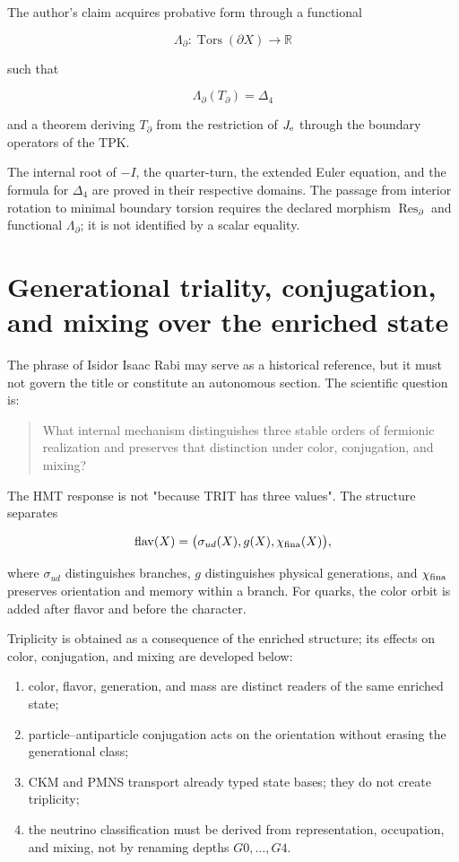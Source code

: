 The author's claim acquires probative form through a functional

\[
\Lambda_\partial:
\operatorname{Tors}(\partial X)
\longrightarrow\mathbb R
\]

such that

\[
\Lambda_\partial(T_\partial)=\Delta_4
\]

and a theorem deriving \(T_\partial\) from the restriction of \(J_{\rm e}\) through the boundary operators of the TPK.

The internal root of \(-I\), the quarter-turn, the extended Euler equation, and the formula for \(\Delta_4\) are proved in their respective domains. The passage from interior rotation to minimal boundary torsion requires the declared morphism \(\operatorname{Res}_{\partial}\) and functional \(\Lambda_{\partial}\); it is not identified by a scalar equality.


\section{Generational triality, conjugation, and mixing over the enriched state}

The phrase of Isidor Isaac Rabi may serve as a historical reference, but it must not govern the title or constitute an autonomous section. The scientific question is:

\begin{quote}
What internal mechanism distinguishes three stable orders of fermionic realization and preserves that distinction under color, conjugation, and mixing?
\end{quote}

The HMT response is not "because TRIT has three values". The structure separates

\[
\operatorname{flav}(X)
=\bigl(\sigma_{ud}(X),g(X),\chi_{\rm fina}(X)\bigr),
\]

where \(\sigma_{ud}\) distinguishes branches, \(g\) distinguishes physical generations, and \(\chi_{\rm fina}\) preserves orientation and memory within a branch. For quarks, the color orbit is added after flavor and before the character.

Triplicity is obtained as a consequence of the enriched structure; its
effects on color, conjugation, and mixing are developed below:

\begin{enumerate}
\item color, flavor, generation, and mass are distinct readers of the same enriched state;
\item particle–antiparticle conjugation acts on the orientation without erasing the generational class;
\item CKM and PMNS transport already typed state bases; they do not create triplicity;
\item the neutrino classification must be derived from representation, occupation, and mixing, not by renaming depths \(G0,\ldots,G4\).
\end{enumerate}

